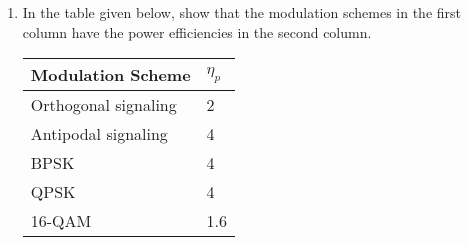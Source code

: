 \documentclass[10pt]{report}
\begin{document}
\begin{enumerate}
  \item In the table given below, show that the modulation schemes in the first column have the power efficiencies in the second column.
    \begin{table}[h]
      \centering
      \begin{tabular}{ll} 
        Modulation Scheme & $\eta_p$ \\ \hline
        Orthogonal signaling & 2 \\
        Antipodal signaling & 4 \\
        BPSK & 4 \\
        QPSK & 4 \\
        16-QAM & 1.6 \\
      \end{tabular}
    \end{table}

\end{enumerate}
\end{document}

